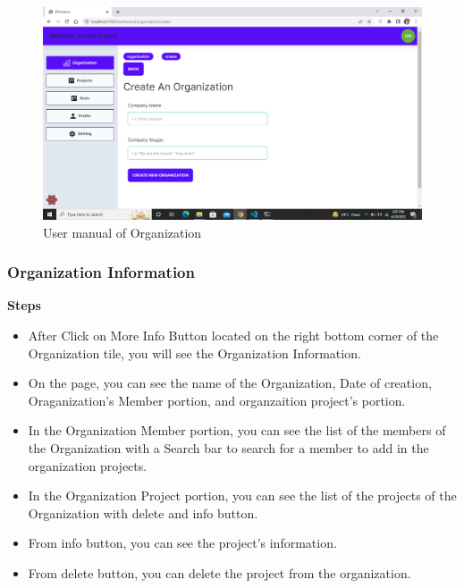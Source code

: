 \begin{figure}[H]
    \centering
    \includegraphics[scale=0.4]{./diagrams/user-manual/Screenshot (19).png}
    \caption{User manual of Organization}
    \label{fig:user-1}

\end{figure}

\subsubsection{Organization Information}
\textbf{Steps}
\begin{itemize}
    \item After Click on More Info Button located on the right bottom corner of the Organization tile, you will see the Organization Information.
    \item On the page, you can see the name of the Organization, Date of creation, Oraganization's Member portion, and organzaition project's portion.
    \item In the Organization Member portion, you can see the list of the members of the Organization with a Search bar to search for a member to add in the organization projects.
    \item In the Organization Project portion, you can see the list of the projects of the Organization with delete and info button.
    \item From info button, you can see the project's information.
    \item From delete button, you can delete the project from the organization.
\end{itemize}

